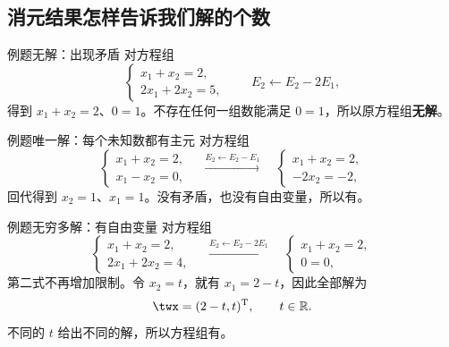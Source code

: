 \documentclass[a4paper,12pt,twoside,openany,fontset=none]{ctexbook}
\newcounter{example}[chapter]
\newenvironment{example}[1][]{\begin{exBox}{例题}{#1}}{\end{exBox}}
\numberwithin{equation}{chapter}
\begin{document}
\subsection*{消元结果怎样告诉我们解的个数}

\begin{example}[无解：出现矛盾]
对方程组
\[
    \begin{cases}x_1+x_2=2,\\2x_1+2x_2=5,\end{cases}
    \qquad E_2\leftarrow E_2-2E_1,
\]
得到 $x_1+x_2=2$、$0=1$。不存在任何一组数能满足 $0=1$，所以原方程组\textbf{无解}。
\end{example}

\begin{example}[唯一解：每个未知数都有主元]
对方程组
\[
    \begin{cases}x_1+x_2=2,\\x_1-x_2=0,\end{cases}
    \quad\xrightarrow{E_2\leftarrow E_2-E_1}\quad
    \begin{cases}x_1+x_2=2,\\-2x_2=-2,\end{cases}
\]
回代得到 $x_2=1$、$x_1=1$。没有矛盾，也没有自由变量，所以有\textbf{}。
\end{example}

\begin{example}[无穷多解：有自由变量]
对方程组
\[
    \begin{cases}x_1+x_2=2,\\2x_1+2x_2=4,\end{cases}
    \quad\xrightarrow{E_2\leftarrow E_2-2E_1}\quad
    \begin{cases}x_1+x_2=2,\\0=0,\end{cases}
\]
第二式不再增加限制。令 $x_2=t$，就有 $x_1=2-t$，因此全部解为
\[
    \twx=(2-t,t)^{\mathrm T},\qquad t\in\mathbb R.
\]
不同的 $t$ 给出不同的解，所以方程组有\textbf{}。
\end{example}
\end{document}
